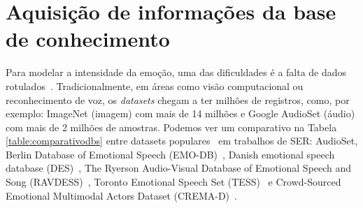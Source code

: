 

\section{Aquisição de informações da base de conhecimento}\label{section:basesdedados}

Para modelar a intensidade da emoção, uma das dificuldades é a falta de dados rotulados~\cite{18}. Tradicionalmente, em áreas como visão computacional ou reconhecimento de voz, os \textit{datasets} chegam a ter milhões de registros, como, por exemplo: ImageNet (imagem) com  mais de 14 milhões e Google AudioSet (áudio) com mais de 2 milhões de amostras. Podemos ver um comparativo na Tabela \ref{table:comparativodbs} entre datasets populares~\cite{32} em trabalhos de \acrshort{SER}: AudioSet, Berlin Database of Emotional Speech (EMO-DB)~\cite{32.55}, Danish emotional speech database (DES)~\cite{32.56}, The Ryerson Audio-Visual Database of Emotional Speech and Song (RAVDESS)~\cite{32.57}, Toronto Emotional Speech Set (TESS)~\cite{32.58} e Crowd-Sourced Emotional Multimodal Actors Dataset (CREMA-D)~\cite{32.59}.


